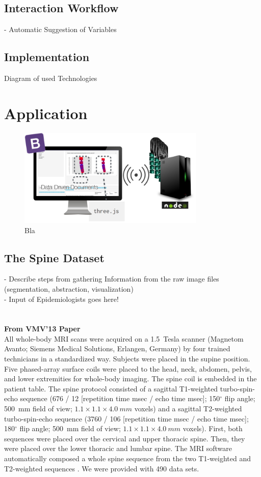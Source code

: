 \documentclass[journal]{style/vgtc}           %
\begin{document}
\subsection{Interaction Workflow}
- Automatic Suggestion of Variables

\subsection{Implementation}
Diagram of used Technologies

\section{Application}
\begin{figure}[htb]
 \centering
 \label{fig:technologies}
 \includegraphics[width=3.5in]{figures/technologies}
 \caption{Bla}
\end{figure}

\subsection{The Spine Dataset}
- Describe steps from gathering Information from the raw image files (segmentation, abstraction, visualization)\\
- Input of Epidemiologists goes here!\\
\\\\
\textbf{From VMV'13 Paper}\\

All whole-body MRI scans were acquired on a 1.5~Tesla scanner (Magnetom Avanto; Siemens Medical Solutions, Erlangen, Germany) by four trained technicians in a standardized way. Subjects were placed in the supine position. Five phased-array surface coils were placed to the head, neck, abdomen, pelvis, and lower extremities for whole-body imaging. The spine coil is embedded in the patient table. The spine protocol consisted of a sagittal T1-weighted turbo-spin-echo sequence (676 / 12 [repetition time msec / echo time msec]; 150$^\circ$ flip angle; 500~mm field of view; $1.1\times1.1\times4.0~mm$ voxels) and a sagittal T2-weighted turbo-spin-echo sequence (3760 / 106 [repetition time msec / echo time msec]; 180$^\circ$ flip angle; 500~mm field of view; $1.1\times1.1\times4.0~mm$ voxels). First, both sequences were placed over the cervical and upper thoracic spine. Then, they were placed over the lower thoracic and lumbar spine. The MRI software automatically composed a whole spine sequence from the two T1-weighted and T2-weighted sequences \cite{Hegenscheid2013}. We were provided with 490 data sets.
\end{document}
